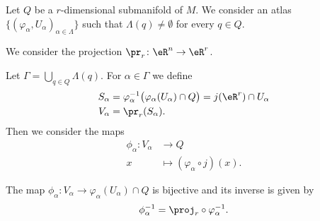 Let \( Q\) be a \( r\)-dimensional submanifold of \( M\). We consider an atlas \( \{ (\varphi_{\alpha},U_{\alpha})_{\alpha\in \Lambda} \}\) such that \( \Lambda(q)\neq \emptyset\) for every \( q\in Q\).

We consider the projection \(\pr_r \colon \eR^n\to \eR^r  \).

Let \( \Gamma=\bigcup_{q\in Q}\Lambda(q)\). For \( \alpha\in \Gamma\) we define
\begin{subequations}
	\begin{align}
		S_{\alpha} & =\varphi_{\alpha}^{-1}\big( \varphi_{\alpha}(U_{\alpha})\cap Q \big) =j(\eR^r)\cap U_{\alpha} \\
		V_{\alpha} & =\pr_r(S_{\alpha}).
	\end{align}
\end{subequations}
Then we consider the maps
\begin{equation}
	\begin{aligned}
		\phi_{\alpha}\colon V_{\alpha} & \to Q                                 \\
		x                              & \mapsto (\varphi_{\alpha}\circ j)(x).
	\end{aligned}
\end{equation}

\begin{lemma}	\label{LEMooUYHPooLPfNVr}
	The map \(\phi_{\alpha} \colon V_{\alpha}\to \varphi_{\alpha}(U_{\alpha})\cap Q  \) is bijective and its inverse is given by
	\begin{equation}
		\phi_{\alpha}^{-1}=\proj_r\circ\varphi_{\alpha}^{-1}.
	\end{equation}
\end{lemma}

